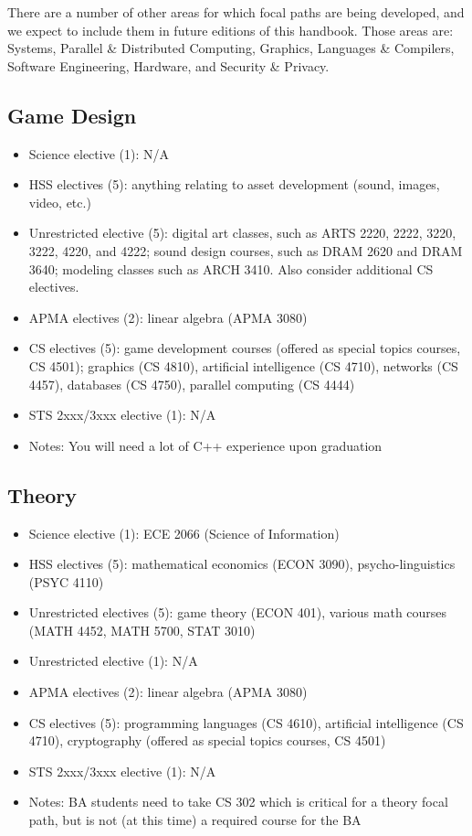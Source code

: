 \documentclass[10pt,letter]{book}
\newenvironment{itemlist}{
\begin{itemize}
\setlength{\itemsep}{0pt}
\setlength{\parskip}{0pt}}
{\end{itemize}}
\begin{document}
There are a number of other areas for which focal paths are being
developed, and we expect to include them in future editions of this
handbook. Those areas are: Systems, Parallel \& Distributed Computing,
Graphics, Languages \& Compilers, Software Engineering, Hardware, and
Security \& Privacy.


\subsection{Game Design}
\begin{itemlist}
\item Science elective (1): N/A
\item HSS electives (5): anything relating to asset development
  (sound, images, video, etc.)
\item Unrestricted elective (5): digital art classes, such as ARTS
  2220, 2222, 3220, 3222, 4220, and 4222; sound design courses, such
  as DRAM 2620 and DRAM 3640; modeling classes such as ARCH 3410.
  Also consider additional CS electives.
\item APMA electives (2): linear algebra (APMA 3080)
\item CS electives (5): game development courses (offered as special
  topics courses, CS 4501); graphics (CS 4810), artificial
  intelligence (CS 4710), networks (CS 4457), databases (CS 4750),
  parallel computing (CS 4444)
\item STS 2xxx/3xxx elective (1): N/A
\item Notes: You will need a lot of C++ experience upon graduation
\end{itemlist}

\subsection{Theory}
\begin{itemlist}
\item Science elective (1): ECE 2066 (Science of Information)
\item HSS electives (5): mathematical economics (ECON 3090),
  psycho-linguistics (PSYC 4110)
\item Unrestricted electives (5): game theory (ECON 401), various math
  courses (MATH 4452, MATH 5700, STAT 3010)
\item Unrestricted elective (1): N/A
\item APMA electives (2): linear algebra (APMA 3080)
\item CS electives (5): programming languages (CS 4610), artificial
  intelligence (CS 4710), cryptography (offered as special topics
  courses, CS 4501)
\item STS 2xxx/3xxx elective (1): N/A
\item Notes: BA students need to take CS 302 which is critical for a
  theory focal path, but is not (at this time) a required course for
  the BA
\end{itemlist}
\end{document}
